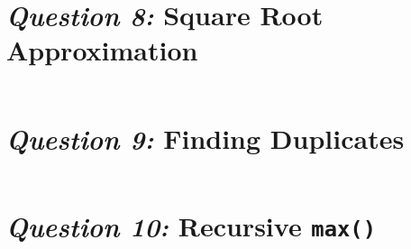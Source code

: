 \documentclass[12pt]{article}
\begin{document}





\begin{lstlisting}[caption={Screen dump for \textit{Question
7}},language=Python]
\end{lstlisting}

\section{\textit{Question 8:} Square Root Approximation}





\begin{lstlisting}[caption={Screen dump for \textit{Question
8}},language=Python]
\end{lstlisting}


\section{\textit{Question 9:} Finding Duplicates}





\begin{lstlisting}[caption={Screen dump for \textit{Question
9}},language=Python]
\end{lstlisting}

\section{\textit{Question 10:} Recursive \texttt{max()}}





\begin{lstlisting}[caption={Screen dump for \textit{Question
10}},language=Python]
\end{lstlisting}
\end{document}
